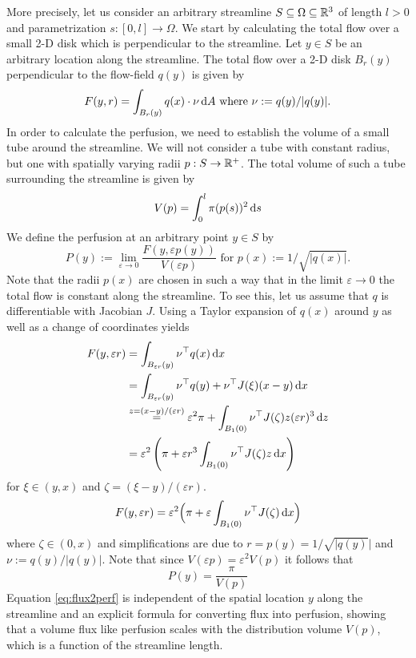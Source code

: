 \documentclass[journal,twocolumn]{IEEEtran}
\begin{document}
	More precisely, let us consider an arbitrary streamline $S \subseteq \Omega \subseteq \mathbb{R}^3$ of length $l>0$ and parametrization $s:[0,l] \to \Omega$.
	We start by calculating the total flow over a small 2-D disk which is perpendicular to the streamline.
	Let $y \in S$ be an arbitrary location along the streamline. 
	The total flow over a 2-D disk $B_r(y)$ perpendicular to the flow-field $q(y)$ is given by
	\[
		F(y,r) = \int_{B_r(y)} q(x) \cdot \nu \,\mathrm{d} A \text{ where }\nu := q(y)/\vert q(y) \vert.
	\]
	In order to calculate the perfusion, we need to establish the volume of a small tube around the streamline.
	We will not consider a tube with constant radius, but one with spatially varying radii $p:S \to \mathbb{R}^+$.
	The total volume of such a tube surrounding the streamline is given by
	\[
		V(p) = \int_0^l \pi (p(s))^2 \,\mathrm{d} s
	\]
	We define the perfusion at an arbitrary point $y \in S$ by
	\[
		P(y):=\lim_{\varepsilon \to 0} \frac{F(y,\varepsilon p(y))}{V(\varepsilon p)} \text{ for } p(x):=1/\sqrt{\vert q(x) \vert}.
	\]
	Note that the radii $p(x)$ are chosen in such a way that in the limit $\varepsilon \to 0$ the total flow is constant along the streamline. 
	To see this, let us assume that $q$ is differentiable with Jacobian $J$.
	Using a Taylor expansion of $q(x)$ around $y$ as well as a change of coordinates yields 
	\begin{align*}
		F(y,\varepsilon r)&=\int_{B_{\varepsilon r}(y)} \nu^\top q(x) \,\mathrm{d} x \\
		&= \int_{B_{\varepsilon r}(y)} \nu^\top q(y)  + \nu^\top J(\xi) (x-y) \,\mathrm{d} x \\
		&\overset{z=(x-y)/(\varepsilon r)}{=} \varepsilon^2 \pi  + \int_{B_{1}(0)} \nu^\top J(\zeta) z  (\varepsilon r)^3 \,\mathrm{d} z \\
		&= \varepsilon^2 \left(\pi + \varepsilon r^3 \int_{B_{1}(0)} \nu^\top J(\zeta)z \,\mathrm{d} x\right)
	\end{align*}
	for $\xi \in (y,x)$ and $\zeta = (\xi-y)/(\varepsilon r)$.
	\[
		F(y,\varepsilon r)
		= \varepsilon^2 \Big(\pi + \varepsilon \int_{B_{1}(0)} \nu^\top J(\zeta) \,\mathrm{d} x\Big)
	\]
	where $\zeta \in (0,x)$ and simplifications are due to $r = p(y) = 1/\sqrt{\vert q(y)} \vert$ and $\nu:=q(y)/\vert q(y) \vert$.
	Note that since $V(\varepsilon p) = \varepsilon^2 V(p)$ it follows that
	\begin{equation}\label{eq:flux2perf}
		P(y)= \frac{\pi}{V(p)}
	\end{equation}
	Equation \eqref{eq:flux2perf} is independent of the spatial location $y$ along the streamline and an explicit formula for converting flux into perfusion, showing that a volume flux like perfusion scales with the distribution volume $V(p)$, which is a function of the streamline length.
	
\end{document}
